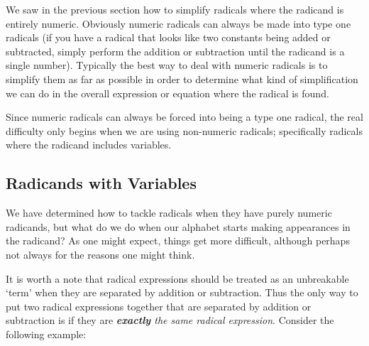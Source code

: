 \documentclass{ximera}
\begin{document}
We saw in the previous section how to simplify radicals where the radicand is entirely numeric. Obviously numeric radicals can always be made into type one radicals (if you have a radical that looks like two constants being added or subtracted, simply perform the addition or subtraction until the radicand is a single number). Typically the best way to deal with numeric radicals is to simplify them as far as possible in order to determine what kind of simplification we can do in the overall expression or equation where the radical is found.

Since numeric radicals can always be forced into being a type one radical, the real difficulty only begins when we are using non-numeric radicals; specifically radicals where the radicand includes variables.

\subsection*{Radicands with Variables}

    We have determined how to tackle radicals when they have purely numeric radicands, but what do we do when our alphabet starts making appearances in the radicand? As one might expect, things get more difficult, although perhaps not always for the reasons one might think.

    It is worth a note that radical expressions should be treated as an unbreakable `term' when they are separated by addition or subtraction. Thus the only way to put two radical expressions together that are separated by addition or subtraction is if they are \textit{\textbf{exactly} the same radical expression}. Consider the following example:
\end{document}
